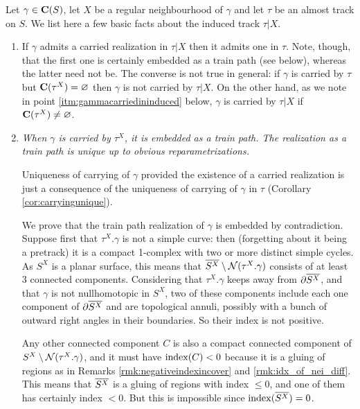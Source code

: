 \begin{rmk}\label{rmk:annulusinducedbasics}
Let $\gamma\in\mathbf C(S)$, let $X$ be a regular neighbourhood of $\gamma$ and let $\tau$ be an almost track on $S$. We list here a few basic facts about the induced track $\tau|X$.

\begin{enumerate}
\item If $\gamma$ admits a carried realization in $\tau|X$ then it admits one in $\tau$. Note, though, that the first one is certainly embedded as a train path (see below), whereas the latter need not be. The converse is not true in general: if $\gamma$ is carried by $\tau$ but $\mathbf C(\tau^X)=\varnothing$ then $\gamma$ is not carried by $\tau|X$. On the other hand, as we note in point \ref{itm:gammacarriedininduced} below, $\gamma$ is carried by $\tau|X$ if $\mathbf C(\tau^X)\not=\varnothing$.

\item\label{itm:embeddedcore} \textit{When $\gamma$ is carried by $\tau^X$, it is embedded as a train path. The realization as a train path is unique up to obvious reparametrizations.}

Uniqueness of carrying of $\gamma$ provided the existence of a carried realization is just a consequence of the uniqueness of carrying of $\gamma$ in $\tau$ (Corollary \ref{cor:carryingunique}). 

We prove that the train path realization of $\gamma$ is embedded by contradiction. Suppose first that $\tau^X.\gamma$ is not a simple curve: then (forgetting about it being a pretrack) it is a compact 1-complex with two or more distinct simple cycles. As $S^X$ is a planar surface, this means that $\overline{S^X}\setminus{\mathcal N}(\tau^X.\gamma)$ consists of at least $3$ connected components. Considering that $\tau^X.\gamma$ keeps away from $\partial\overline{S^X}$, and that $\gamma$ is not nullhomotopic in $S^X$, two of these components include each one component of $\partial\overline{S^X}$ and are topological annuli, possibly with a bunch of outward right angles in their boundaries. So their index is not positive.

Any other connected component $C$ is also a compact connected component of $S^X\setminus{\mathcal N}(\tau^X.\gamma)$, and it must have $\mathrm{index}(C)<0$ because it is a gluing of regions as in Remarks \ref{rmk:negativeindexincover} and \ref{rmk:idx_of_nei_diff}. This means that $\overline{S^X}$ is a gluing of regions with index $\leq 0$, and one of them has certainly index $<0$. But this is impossible since $\mathrm{index}(\overline{S^X})=0$.


\end{enumerate}
\end{rmk}
